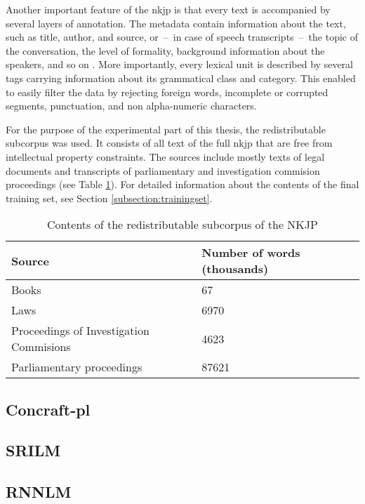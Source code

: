 Another important feature of the \gls{nkjp} is that every text is accompanied by several layers of annotation. The metadata contain information about the text, such as title, author, and source, or~--~in case of speech transcripts~--~the topic of the conversation, the level of formality, background information about the speakers, and so on \cite{przepiorkowski2009xml}. More importantly, every lexical unit is described by several tags carrying information about its grammatical class and category. This enabled to easily filter the data by rejecting foreign words, incomplete or corrupted segments, punctuation, and non alpha-numeric characters. 

For the purpose of the experimental part of this thesis, the redistributable subcorpus was used. It consists of all text of the full \gls{nkjp} that are free from intellectual property constraints. The sources include mostly texts of legal documents and transcripts of parliamentary and investigation commision proceedings (see Table \ref{table:freenkjp}). For detailed information about the contents of the final training set, see Section \ref{subsection:trainingset}.

\begin{table}[h!]
  \begin{center}
	  \caption{Contents of the redistributable subcorpus of the NKJP}
	    \label{table:freenkjp}
	    \begin{tabular*}{.8\linewidth}{@{\extracolsep{\fill}}ll}
      Source & Number of words (thousands) \\
      \midrule
      Books & 67\\
      Laws & 6970\\
      Proceedings of Investigation Commisions & 4623\\
      Parliamentary proceedings & 87621\\
    \end{tabular*}
  \end{center}
\end{table}

\subsection{Concraft-pl}
\subsection{SRILM}
\subsection{RNNLM}
